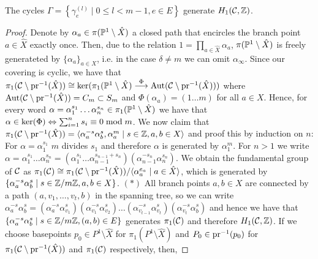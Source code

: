 \documentclass[main.tex]{subfiles}
\begin{document}
  \begin{thm}\label{thm:gen_set}
   The cycles $\Gamma = \left\{  \gamma_{e}^{(l)}  \mid  0 \le l <m-1,  e \in E  \right\}$ generate $\homo$.
  \end{thm}
  \begin{proof}
  Denote by $\alpha_a \in \pi(\P^1 \setminus \hat{X})$ a closed path that encircles the branch point $a \in \hat{X}$ exactly once. Then,  due to the relation $1 = \prod_{a \in \hat{X}} \alpha_a$,
  $\pi(\P^1 \setminus \hat{X})$ is freely generateted by $\{ \alpha_a \}_{a \in X}$, i.e. in the case $\delta \ne m$ we can omit $\alpha_{\infty}$. \abstand
  Since our covering is cyclic, we have that $
  \pi_1(\cu \setminus \pr^{-1}(\hat{X})) \isom \ker(\pi_1(\P^1 \setminus \hat{X}) \overset{\Phi}{\To} \Aut(\cu \setminus \pr^{-1}(\hat{X})))$ where $\Aut(\cu \setminus \pr^{-1}(\hat{X})) = C_m
  \subset S_m$
  and $\Phi(\alpha_a) = (1 \dots m)$ for all $a \in X$. Hence, for every word $\alpha = \alpha_1^{s_1}\dots \alpha_n^{s_n} \in \pi_1(\P^1 \setminus \hat{X})$ we have that
  $\alpha \in \ker(\Phi) \eq \sum_{i=1}^n s_i \equiv 0 \bmod m$. \abstand
  We now claim that $\pi_1(\cu \setminus \pr^{-1}(\hat{X})) = \langle  \alpha_a^{-s} \alpha_b^{s},  \alpha_a^m   \mid  s \in \Z, a,b \in X  \rangle$
  and proof this by induction on $n$: For $\alpha = \alpha_1^{s_1}$ $m$ divides $s_1$ and therefore $\alpha$ is generated by $\alpha_1^m$. For $n > 1$ we write
  $\alpha = \alpha_1^{s_1}\dots \alpha_n^{s_n} = (\alpha_1^{s_1} \dots \alpha_{n-1}^{s_{n-1}+s_n})(\alpha_{n-1}^{-s_n}\alpha_n^{s_n})$. \abstand
  We obtain the fundamental group of $\cu$ as
  $\pi_1(\cu) \isom \pi_1(\cu \setminus \pr^{-1}(\hat{X})) / \langle  \alpha_a^{e_a}  \mid  a \in \hat{X}  \rangle$, which is generated by
  $\{  \alpha_a^{-s} \alpha_b^{s}  \mid  s \in \Z/m\Z,  a,b \in X  \}$. $(*)$ \abstand
  All branch points $a,b \in X$ are connected by a path $(a,v_1,\dots,v_t,b)$ in the spanning tree, so we can write $\alpha_a^{-s} \alpha_b^{s} = (\alpha_a^{-s}\alpha_{v_1}^{s})
  (\alpha_{v_1}^{-s}\alpha_{v_2}^{s})\dots(\alpha_{v_{t-1}}^{-s}\alpha_{v_t}^{s})(\alpha_{v_t}^{-s}\alpha_b^{s})$ and hence we have that
  $\{ \alpha_a^{-s} \alpha_b^{s}  \mid  s \in \Z/m\Z,  (a,b) \in E \}$ generates $\pi_1(\cu)$ and therefore $\homo$. \abstand
  If we choose basepoints $p_0 \in P^1 \setminus \hat{X}$ for $\pi_1(P^1 \setminus \hat{X})$ and $P_0 \in \pr^{-1}(p_0)$ for $\pi_1(\cu \setminus \pr^{-1}(\hat{X}))$ and $\pi_1(\cu)$ respectively, then,

\end{proof}
\end{document}
